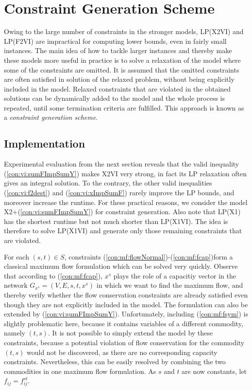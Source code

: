 \section{Constraint Generation Scheme}
\label{sec:cg}
Owing to the large number of constraints in the stronger models, LP(X2VI) and LP(F2VI) are impractical for computing lower bounds, even in fairly small instances.
The main idea of how to tackle larger instances and thereby make these models more useful in practice is to solve a relaxation of the model where some of the constraints are omitted.
It is assumed that the omitted constraints are often satisfied in solution of the relaxed problem, without being explicitly included in the model.
Relaxed constraints that are violated in the obtained solutions can be dynamically added to the model and the whole process is repeated, until some termination criteria are fulfilled.
This approach is known as a \emph{constraint generation scheme}.

\subsection{Implementation}%

Experimental evaluation from the next section reveals that the valid inequality (\ref{con:vi:sumFImpSumY}) makes X2VI very strong, in fact its LP relaxation often gives an integral solution.
To the contrary, the other valid inequalities (\ref{con:vi:f2dest}) and (\ref{con:vi:xImpSumF}) rarely improve the LP bounds, and moreover increase the runtime.
For these practical reasons, we consider the model X2+(\ref{con:vi:sumFImpSumY}) for constraint generation.
Also note that LP(X1) has the shortest runtime but not much shorter than LP(X1VI).
The idea is therefore to solve LP(X1VI) and generate only those remaining constraints that are violated.

For each $(s,t)\in S$, constraints (\ref{con:mf:flowNormal})-(\ref{con:mf:fcap})form a classical maximum flow formulation which can be solved very quickly.
Observe that according to (\ref{con:mf:fcap}), $x^s$ plays the role of a capacitiy vector in the network $G_{x^s}=(V,E,s,t,x^s)$ in which we want to find the maximum flow, and thereby verify whether the flow conservation constraints are already satisfied even though they are not explicitly included in the model.
The formulation can also be extended by (\ref{con:vi:sumFImpSumY}).
Unfortunately, including (\ref{con:mf:fsym}) is slightly problematic here, because it contains variables of a different commodity, namely $(t,s)$.
It is not possible to simply extend the model by these constraints, because a potential violation of flow conservation for the commodity $(t,s)$ would not be discovered, as there are no corresponding capacity constraints.
Nevertheless, this can be easily resolved by combining the two commodities in one maximum flow formulation.
As $s$ and $t$ are now constants, let $f_{ij}=f^{st}_{ij}$.


